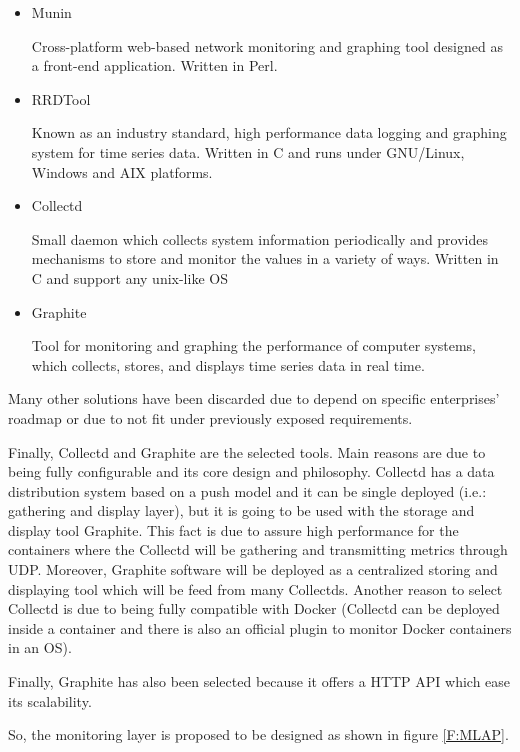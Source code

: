 \begin{itemize}
\item Munin \cite{munin}\hfill

Cross-platform web-based network monitoring and graphing tool designed as a front-end application. Written in Perl.

\item RRDTool \cite{rrdtool}\hfill

Known as an industry standard, high performance data logging and graphing system for time series data. Written in C and runs under GNU/Linux, Windows and AIX platforms.

\item Collectd \cite{collectd}\hfill

Small daemon which collects system information periodically and provides mechanisms to store and monitor the values in a variety of ways. Written in C and support any unix-like OS

\item Graphite \cite{graphite}\hfill

Tool for monitoring and graphing the performance of computer systems, which collects, stores, and displays time series data in real time.

\end{itemize}

Many other solutions have been discarded due to depend on specific enterprises' roadmap or due to not fit under previously exposed requirements.

Finally, Collectd and Graphite are the selected tools. Main reasons are due to being fully configurable and its core design and philosophy. Collectd has a data distribution system based on a push model and it can be single deployed (i.e.: gathering and display layer), but it is going to be used with the storage and display tool Graphite. This fact is due to assure high performance for the containers where the Collectd will be gathering and transmitting metrics through UDP. Moreover, Graphite software will be deployed as a centralized storing and displaying tool which will be feed from many Collectds. Another reason to select Collectd is due to being fully compatible with Docker (Collectd can be deployed inside a container and there is also an official plugin to monitor Docker containers in an OS). 

Finally, Graphite has also been selected because it offers a HTTP API which ease its scalability. 

So, the monitoring layer is proposed to be designed as shown in figure \ref{F:MLAP}.


